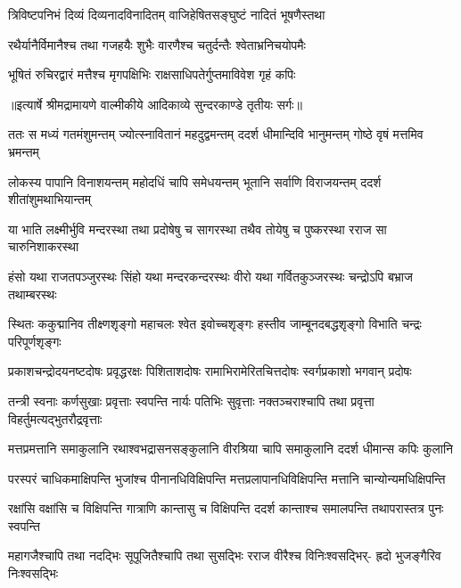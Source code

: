 \twolineshloka
{त्रिविष्टपनिभं दिव्यं दिव्यनादविनादितम्}
{वाजिहेषितसङ्घुष्टं नादितं भूषणैस्तथा} %

\twolineshloka
{रथैर्यानैर्विमानैश्च तथा गजहयैः शुभैः}
{वारणैश्च चतुर्दन्तैः श्वेताभ्रनिचयोपमैः} %

\twolineshloka
{भूषितं रुचिरद्वारं मत्तैश्च मृगपक्षिभिः}
{राक्षसाधिपतेर्गुप्तमाविवेश गृहं कपिः} %


{॥इत्यार्षे श्रीमद्रामायणे वाल्मीकीये आदिकाव्ये सुन्दरकाण्डे तृतीयः सर्गः॥}


\fourlineindentedshloka
{ततः स मध्यं गतमंशुमन्तम्}
{ज्योत्स्नावितानं महदुद्वमन्तम्}
{ददर्श धीमान्दिवि भानुमन्तम्}
{गोष्ठे वृषं मत्तमिव भ्रमन्तम्} %

\fourlineindentedshloka
{लोकस्य पापानि विनाशयन्तम्}
{महोदधिं चापि समेधयन्तम्}
{भूतानि सर्वाणि विराजयन्तम्}
{ददर्श शीतांशुमथाभियान्तम्} %

\fourlineindentedshloka
{या भाति लक्ष्मीर्भुवि मन्दरस्था}
{तथा प्रदोषेषु च सागरस्था}
{तथैव तोयेषु च पुष्करस्था}
{रराज सा चारुनिशाकरस्था} %

\fourlineindentedshloka
{हंसो यथा राजतपञ्जुरस्थः}
{सिंहो यथा मन्दरकन्दरस्थः}
{वीरो यथा गर्वितकुञ्जरस्थः}
{चन्द्रोऽपि बभ्राज तथाम्बरस्थः} %

\fourlineindentedshloka
{स्थितः ककुद्मानिव तीक्ष्णशृङ्गो}
{महाचलः श्वेत इवोच्चशृङ्गः}
{हस्तीव जाम्बूनदबद्धशृङ्गो}
{विभाति चन्द्रः परिपूर्णशृङ्गः} %

\fourlineindentedshloka
{प्रकाशचन्द्रोदयनष्टदोषः}
{प्रवृद्धरक्षः पिशिताशदोषः}
{रामाभिरामेरितचित्तदोषः}
{स्वर्गप्रकाशो भगवान् प्रदोषः} %

\fourlineindentedshloka
{तन्त्री स्वनाः कर्णसुखाः प्रवृत्ताः}
{स्वपन्ति नार्यः पतिभिः सुवृत्ताः}
{नक्तञ्चराश्चापि तथा प्रवृत्ता}
{विहर्तुमत्यद्भुतरौद्रवृत्ताः} %

\fourlineindentedshloka
{मत्तप्रमत्तानि समाकुलानि}
{रथाश्वभद्रासनसङ्कुलानि}
{वीरश्रिया चापि समाकुलानि}
{ददर्श धीमान्स कपिः कुलानि} %

\fourlineindentedshloka
{परस्परं चाधिकमाक्षिपन्ति}
{भुजांश्च पीनानधिविक्षिपन्ति}
{मत्तप्रलापानधिविक्षिपन्ति}
{मत्तानि चान्योन्यमधिक्षिपन्ति} %

\fourlineindentedshloka
{रक्षांसि वक्षांसि च विक्षिपन्ति}
{गात्राणि कान्तासु च विक्षिपन्ति}
{ददर्श कान्ताश्च समालपन्ति}
{तथापरास्तत्र पुनः स्वपन्ति} %

\fourlineindentedshloka
{महागजैश्चापि तथा नदद्भिः}
{सूपूजितैश्चापि तथा सुसद्भिः}
{रराज वीरैश्च विनिःश्वसद्भिर्-}
{ह्रदो भुजङ्गैरिव निःश्वसद्भिः} %

